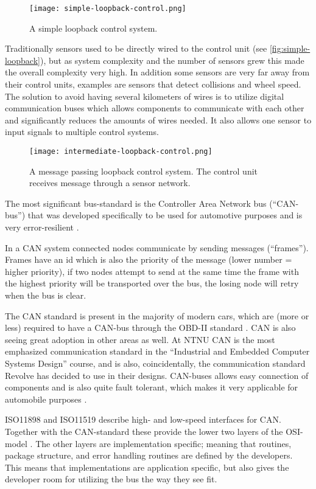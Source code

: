 \begin{figure}[!htbp]
	\texttt{[image: simple-loopback-control.png]}
	\caption{A simple loopback control system.}
	\label{fig:simple-loopback}
\end{figure}
\noindent Traditionally sensors used to be directly wired to the control unit (see \vref{fig:simple-loopback}), but as
system complexity and the
number of sensors grew this made the overall complexity very high. In addition
some sensors are very far away from their control units, examples are sensors 
that detect collisions and wheel speed. The solution to avoid having several 
kilometers of wires is to utilize digital communication buses which allows
components to communicate with each other and significantly reduces the amounts of 
wires needed. It also allows one sensor to input signals to multiple
control systems.
\begin{figure}[!htbp]
	\texttt{[image: intermediate-loopback-control.png]}
	\caption{A message passing loopback control system. The control unit receives
	message through a sensor network.}
	\label{fig:intermediate-loopback}
\end{figure}

The most significant bus-standard is the Controller Area Network bus
(``CAN-bus'')
that was developed specifically to be used for automotive purposes and is
very error-resilient \cite[1]{can-appnote}.

In a CAN system connected nodes communicate by sending messages (``frames'').
Frames have an id which is also the priority of the message (lower number =
higher priority), if two nodes attempt to send at the same time the frame
with the highest priority will be transported over the bus, the losing node
will retry when the bus is clear. \cite{can-appnote}

The CAN standard is present in the majority of modern cars, which are (more or less) required to
have a CAN-bus through the OBD-II standard \cite{wiki:OBDII}. CAN is also seeing
great adoption in other areas as well. At NTNU CAN is the most emphasized
communication standard in the ``Industrial and Embedded Computer Systems
Design'' course, and is also, coincidentally, the communication standard 
Revolve has decided to
use in their designs. CAN-buses allows easy connection of components and is
also quite fault tolerant, which makes it very applicable for automobile
purposes \cite{can-appnote}.

ISO11898 and ISO11519 describe high- and low-speed interfaces for CAN. 
Together with the CAN-standard these provide the lower 
two layers of the OSI-model \cite{microsoft:osi}. The other layers are 
implementation specific; meaning that routines, package structure, 
and error handling routines are defined by the developers. This means that 
implementations are application specific, but also gives the 
developer room for utilizing the bus the way they see fit. \cite{can-appnote}

